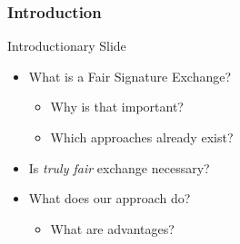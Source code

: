 \begin{frame}
	\frametitle{Introduction}
	Introductionary Slide

	\begin{itemize}
		\item What is a Fair Signature Exchange?
			\begin{itemize}
				\item Why is that important?
				\item Which approaches already exist?
			\end{itemize}
		\item Is \textit{truly fair} exchange necessary?
		\item What does our approach do?
			\begin{itemize}
				\item What are advantages?
			\end{itemize}
	\end{itemize}
\end{frame}